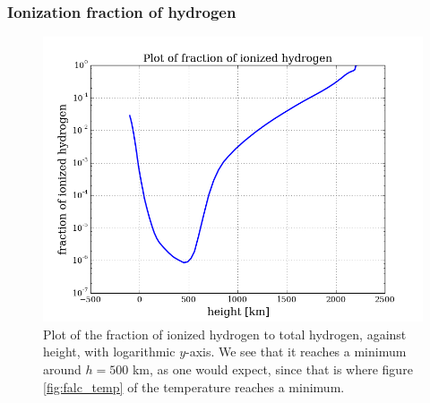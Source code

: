 \documentclass{article}
\begin{document}
\subsubsection{Ionization fraction of hydrogen}
\begin{figure}[H]
  \centering
  \includegraphics[scale=0.5]{../figures/falc/falc_h_Hion.png}
  \caption{Plot of the fraction of ionized hydrogen to total hydrogen, against height, with logarithmic $y$-axis. We see that it reaches a minimum around $h=500$ km, as one would expect, since that is where figure \ref{fig:falc_temp} of the temperature reaches a minimum.}
\end{figure}
\end{document}
